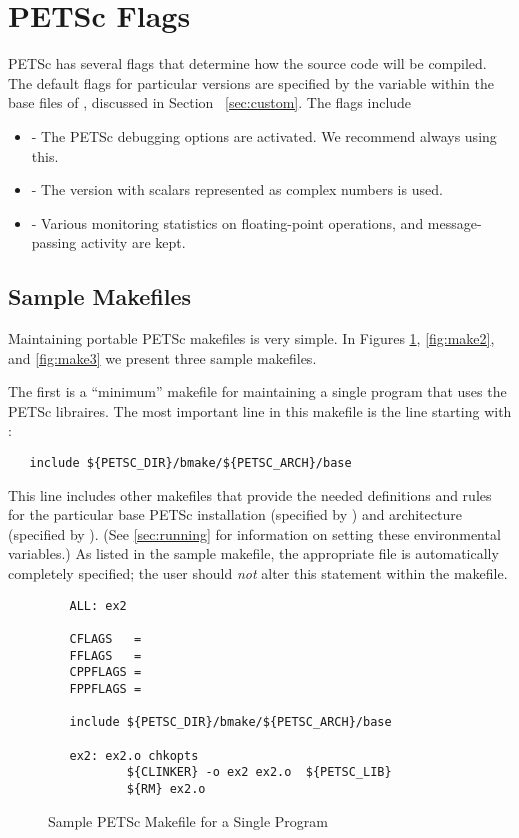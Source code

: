 \section{PETSc Flags}
\label{sec:makeflags}

PETSc has several flags that determine how the source code will be
compiled.  The default flags for particular versions are specified by
the variable  within the base files of , discussed in Section
~\ref{sec:custom}.  The flags include
\begin{itemize}
\item {} - The PETSc debugging options are activated. We 
      recommend always using this. 
\item {} - The version with scalars represented 
      as complex numbers is used. 
\item {} - Various monitoring statistics on floating-point operations,
      and message-passing activity are kept. 
\end{itemize}

\subsection{Sample Makefiles}

Maintaining portable PETSc makefiles is very simple. In Figures
\ref{fig:make1}, \ref{fig:make2}, and \ref{fig:make3} we present three
sample makefiles.  

The first is a ``minimum'' makefile for maintaining
a single program that uses the PETSc libraires.
The most important line in this makefile is the line starting with :
\begin{verbatim}
   include ${PETSC_DIR}/bmake/${PETSC_ARCH}/base
\end{verbatim}
This line includes other makefiles that provide the needed definitions
and rules for the particular base PETSc installation (specified by
) and architecture (specified by
).  (See \ref{sec:running} for information on
setting these environmental variables.)  As listed in the sample
makefile, the appropriate  file is automatically
completely specified; the user should {\em not} alter this statement
within the makefile.

\begin{figure}[H]
{\small
\begin{verbatim}
   ALL: ex2

   CFLAGS   = 
   FFLAGS   = 
   CPPFLAGS =
   FPPFLAGS =

   include ${PETSC_DIR}/bmake/${PETSC_ARCH}/base

   ex2: ex2.o chkopts
           ${CLINKER} -o ex2 ex2.o  ${PETSC_LIB}
           ${RM} ex2.o
\end{verbatim}
}
\caption{Sample PETSc Makefile for a Single Program}
\label{fig:make1}
\end{figure}


